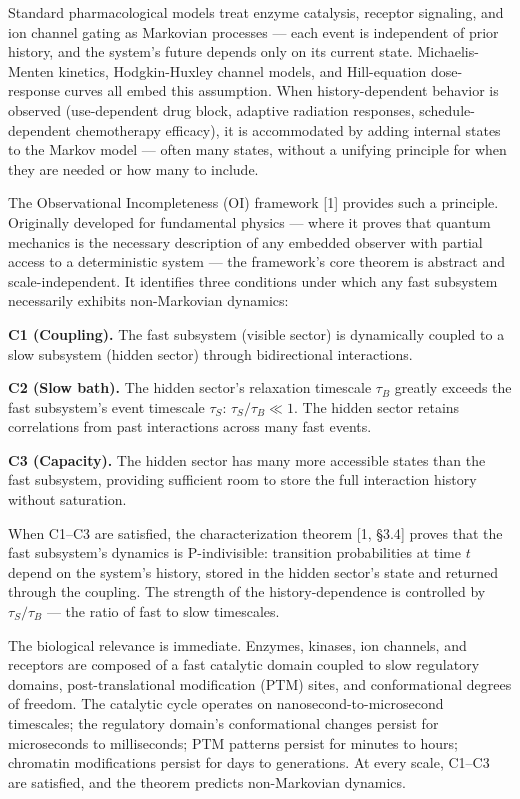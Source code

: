 \documentclass[
]{article}
\begin{document}
Standard pharmacological models treat enzyme catalysis, receptor
signaling, and ion channel gating as Markovian processes --- each event
is independent of prior history, and the system's future depends only on
its current state. Michaelis-Menten kinetics, Hodgkin-Huxley channel
models, and Hill-equation dose-response curves all embed this
assumption. When history-dependent behavior is observed (use-dependent
drug block, adaptive radiation responses, schedule-dependent
chemotherapy efficacy), it is accommodated by adding internal states to
the Markov model --- often many states, without a unifying principle for
when they are needed or how many to include.

The Observational Incompleteness (OI) framework {[}1{]} provides such a
principle. Originally developed for fundamental physics --- where it
proves that quantum mechanics is the necessary description of any
embedded observer with partial access to a deterministic system --- the
framework's core theorem is abstract and scale-independent. It
identifies three conditions under which any fast subsystem necessarily
exhibits non-Markovian dynamics:

\textbf{C1 (Coupling).} The fast subsystem (visible sector) is
dynamically coupled to a slow subsystem (hidden sector) through
bidirectional interactions.

\textbf{C2 (Slow bath).} The hidden sector's relaxation timescale
\(\tau_B\) greatly exceeds the fast subsystem's event timescale
\(\tau_S\): \(\tau_S / \tau_B \ll 1\). The hidden sector retains
correlations from past interactions across many fast events.

\textbf{C3 (Capacity).} The hidden sector has many more accessible
states than the fast subsystem, providing sufficient room to store the
full interaction history without saturation.

When C1--C3 are satisfied, the characterization theorem {[}1, §3.4{]}
proves that the fast subsystem's dynamics is P-indivisible: transition
probabilities at time \(t\) depend on the system's history, stored in
the hidden sector's state and returned through the coupling. The
strength of the history-dependence is controlled by \(\tau_S / \tau_B\)
--- the ratio of fast to slow timescales.

The biological relevance is immediate. Enzymes, kinases, ion channels,
and receptors are composed of a fast catalytic domain coupled to slow
regulatory domains, post-translational modification (PTM) sites, and
conformational degrees of freedom. The catalytic cycle operates on
nanosecond-to-microsecond timescales; the regulatory domain's
conformational changes persist for microseconds to milliseconds; PTM
patterns persist for minutes to hours; chromatin modifications persist
for days to generations. At every scale, C1--C3 are satisfied, and the
theorem predicts non-Markovian dynamics.
\end{document}
